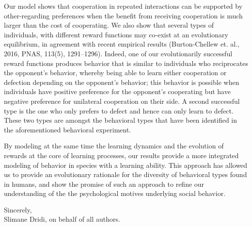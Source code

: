 \documentclass[11pt,letterpaper]{letter} %
\begin{document}
\begin{letter}
Our model shows that cooperation in repeated interactions can be supported by other-regarding preferences when the benefit from receiving cooperation is much larger than the cost of cooperating. We also show that several types of individuals, with different reward functions may co-exist at an evolutionary equilibrium, in agreement with recent empirical results (Burton-Chellew et. al., 2016, PNAS, 113(5), 1291--1296). Indeed, one of our evolutionarily successful reward functions produces behavior that is similar to individuals who reciprocates the opponent's behavior, whereby being able to learn either cooperation or defection depending on the opponent's behavior; this behavior is possible when individuals have positive preference for the opponent's cooperating but have negative preference for unilateral cooperation on their side. A second successful type is the one who only prefers to defect and hence can only learn to defect. These two types are amongst the behavioral types that have been identified in the aforementioned behavioral experiment.


By modeling at the same time the learning dynamics and the evolution of rewards at the core of learning processes, our results provide a more integrated modeling of behavior in species with a learning ability. This approach has allowed us to provide an evolutionary rationale for the diversity of behavioral types found in humans, and show the promise of such an approach to refine our understanding of the the psychological motives underlying social behavior.





\closing{Sincerely,\\%
Slimane Dridi, on behalf of all authors.}




\end{letter}
\end{document}

